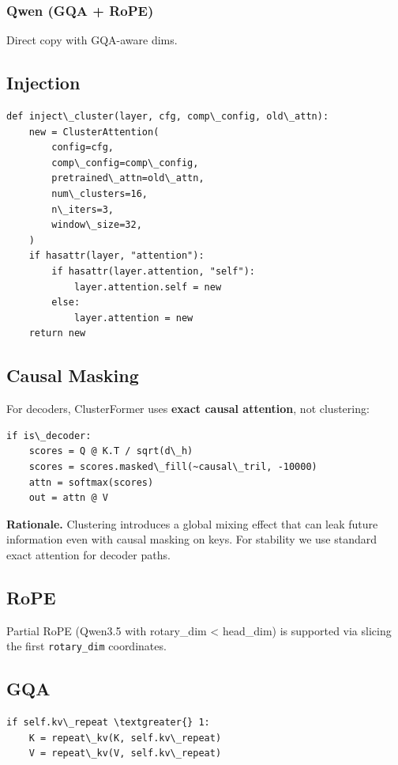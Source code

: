 \subsubsection{Qwen (GQA + RoPE)}
Direct copy with GQA-aware dims.

\subsection{Injection}

\begin{lstlisting}
def inject\_cluster(layer, cfg, comp\_config, old\_attn):
    new = ClusterAttention(
        config=cfg,
        comp\_config=comp\_config,
        pretrained\_attn=old\_attn,
        num\_clusters=16,
        n\_iters=3,
        window\_size=32,
    )
    if hasattr(layer, "attention"):
        if hasattr(layer.attention, "self"):
            layer.attention.self = new
        else:
            layer.attention = new
    return new
\end{lstlisting}

\subsection{Causal Masking}

For decoders, ClusterFormer uses \textbf{exact causal attention}, not clustering:

\begin{lstlisting}
if is\_decoder:
    scores = Q @ K.T / sqrt(d\_h)
    scores = scores.masked\_fill(~causal\_tril, -10000)
    attn = softmax(scores)
    out = attn @ V
\end{lstlisting}

\textbf{Rationale.} Clustering introduces a global mixing effect that can leak 
future information even with causal masking on keys. For stability we 
use standard exact attention for decoder paths.

\subsection{RoPE}

Partial RoPE (Qwen3.5 with rotary\_dim \textless{} head\_dim) is supported via slicing 
the first \texttt{rotary\_dim} coordinates.

\subsection{GQA}

\begin{lstlisting}
if self.kv\_repeat \textgreater{} 1:
    K = repeat\_kv(K, self.kv\_repeat)
    V = repeat\_kv(V, self.kv\_repeat)
\end{lstlisting}

